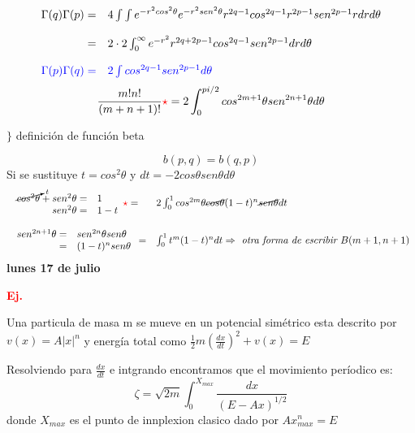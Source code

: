 \documentclass{article}
\theoremstyle{definition}
\begin{document}
\[
\begin{array}{rl}
	\Gamma (q)\Gamma (p)=& 4\int\int e^{-r^2cos^2\theta}e^{-r^2sen^2\theta}r^{2q-1}cos^{2q-1}r^{2p-1}sen^{2p-1}rdrd\theta\\
	\\
	=& 2\cdot 2 \int^{\infty}_0 e^{-r^2}r^{2q+2p-1}cos^{2q-1}sen^{2p-1}drd\theta\\
	\\
	\textcolor{blue}{\Gamma (p)\Gamma (q)=}&\textcolor{blue}{2\int cos^{2q-1}sen^{2p-1} d\theta}
\end{array}
\]
\[\frac{m! n!}{(m+n+1)!}\textcolor{red}{\star}= 2\int^{pi /2}_0 cos^{2m+1}\theta sen^{2n+1}\theta d \theta\]

\begin{center}
\fbox{\begin{minipage}{15em}
  \[b(p,q)=\frac{\Gamma (q)\Gamma (p)}{\Gamma (q+p)}\]
\end{minipage}} $\Bigg\}$ definición de función beta
\end{center}
\[b(p,q)=b(q,p)\]
Si se sustituye $t=cos^2\theta$ y $dt=-2cos\theta sen\theta d\theta$
\[
\begin{array}{ll}
	\begin{array}{rl}
		\cancelto{t}{cos^2\theta}+sen^2\theta=&1\\
		sen^2\theta =&1-t
	\end{array} \textcolor{red}{\star}= & 2\int^{1}_0 cos^{2m}\theta\cancel{cos\theta} (1-t)^n\cancel{sen\theta}dt\\
	\\
	\begin{array}{rl}
		sen^{2n+1}\theta=&sen^{2n}\theta sen\theta\\
		=&(1-t)^n sen\theta
	\end{array} = & \int^{1}_0 t^m (1-t)^n dt\Rightarrow \textit{ otra forma de escribir } B(m+1,n+1)
\end{array}
\]
\newpage
\textbf{lunes 17 de julio}

\textbf{\textcolor{red}{Ej.}}

Una particula de masa m se mueve en un potencial simétrico esta descrito por $v(x)=A|x|^n$ y energía total como $\frac{1}{2}m\left(\frac{dx}{dt}\right)^2 +v(x)=E$

Resolviendo para $\frac{dx}{dt}$ e intgrando encontramos que el movimiento períodico es:
\[\zeta=\sqrt{2m}\int^{X_{max}}_0 \frac{dx}{(E-Ax)^{1/2}}\]
donde $X_{max}$ es el punto de innplexion clasico dado por $Ax_{max}^n=E$
\end{document}
